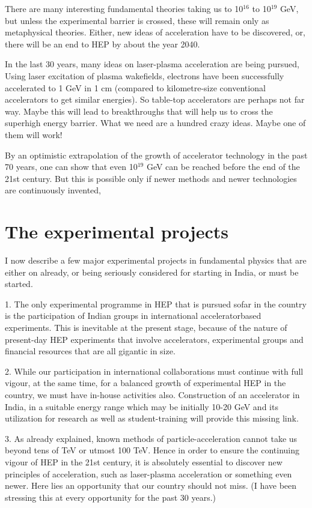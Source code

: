 There are many interesting fundamental theories taking us to 10$^{16}$ to
10$^{19}$ GeV, but unless the experimental barrier is crossed, these will remain
only as metaphysical theories. Either, new ideas of acceleration have to be
discovered, or, there will be an end to HEP by about the year 2040. 


In the last 30 years, many ideas on laser-plasma acceleration are being
pursued, Using laser excitation of plasma wakefields, electrons have been
successfully accelerated to 1 GeV in 1 cm (compared to kilometre-size conventional accelerators to get similar energies). So table-top accelerators are
perhaps not far way. Maybe this will lead to breakthroughs that will help
us to cross the superhigh energy barrier. What we need are a hundred crazy
ideas. Maybe one of them will work! 


By an optimistic extrapolation of the growth of accelerator technology in
the past 70 years, one can show that even 10$^{19}$ GeV can be reached before
the end of the 21st century. But this is possible only if newer methods and
newer technologies are continuously invented, 


\section*{The experimental projects} 


I now describe a few major experimental projects in fundamental physics
that are either on already, or being seriously considered for starting in India,
or must be started. 


1. The only experimental programme in HEP that is pursued sofar in
the country is the participation of Indian groups in international acceleratorbased experiments. This is inevitable at the present stage, because of the
nature of present-day HEP experiments that involve accelerators, experimental groups and financial resources that are all gigantic in size. 


2. While our participation in international collaborations must continue
with full vigour, at the same time, for a balanced growth of experimental HEP in the country, we must have in-house activities also. Construction of
an accelerator in India, in a suitable energy range which may be initially
10-20 GeV and its utilization for research as well as student-training will
provide this missing link. 


3. As already explained, known methods of particle-acceleration cannot
take us beyond tens of TeV or utmost 100 TeV. Hence in order to ensure
the continuing vigour of HEP in the 21st century, it is absolutely essential to
discover new principles of acceleration, such as laser-plasma acceleration or
something even newer. Here lies an opportunity that our country should not
miss. (I have been stressing this at every opportunity for the past 30 years.) 


